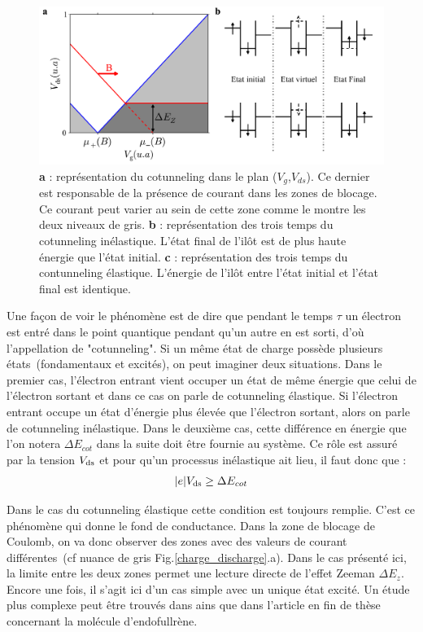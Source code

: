 \begin{figure}
\includegraphics[scale=0.5]{Theorie/Transport/figure5/figure5.pdf} 
\caption{\textbf{a} : représentation du cotunneling dans le plan ($V_g$,$V_{ds}$). Ce dernier est responsable de la présence de courant dans les zones de blocage. Ce courant peut varier au sein de cette zone comme le montre les deux niveaux de gris. \textbf{b} : représentation des trois temps du cotunneling inélastique. L'état final de l'il\^ot est de plus haute énergie que l'état initial. \textbf{c} :  représentation des trois temps du contunneling élastique. L'énergie de l'il\^ot entre l'état initial et l'état final est identique.}
\label{cotun}
\end{figure}


Une façon de voir le phénomène est de dire que pendant le temps $\tau$ un électron est entré dans le point quantique pendant qu'un autre en est sorti, d'où l'appellation de "cotunneling". Si un m\^eme état de charge possède plusieurs états~(fondamentaux et excités), on peut imaginer deux situations. Dans le premier cas, l'électron entrant vient occuper un état de m\^eme énergie que celui de l'électron sortant et dans ce cas on parle de cotunneling élastique. Si l'électron entrant occupe un état d'énergie plus élevée que l'électron sortant, alors on parle de cotunneling inélastique. Dans le deuxième cas, cette différence en énergie que l'on notera $\Delta E_{cot}$ dans la suite doit être fournie au système. Ce rôle est assuré par la tension $V_{\rm{ds}}$ et pour qu'un processus inélastique ait lieu, il faut donc que :
\begin{eqnarray}
|e|V_{\rm{ds}} \geq \Delta E_{cot}
\end{eqnarray}

Dans le cas du cotunneling élastique cette condition est toujours remplie. C'est ce phénomène qui donne le fond de conductance. Dans la zone de blocage de Coulomb, on va donc observer des zones avec des valeurs de courant différentes~(cf nuance de gris Fig.\ref{charge_discharge}.a). Dans le cas présenté ici, la limite entre les deux zones permet une lecture directe de l'effet Zeeman $\Delta E_z$. Encore une fois, il s'agit ici d'un cas simple avec un unique état excité. Un étude plus complexe peut \^etre trouvés dans \cite{DeFranceschi2001} ains que dans l'article en fin de thèse concernant la molécule d'endofullrène.\newline


